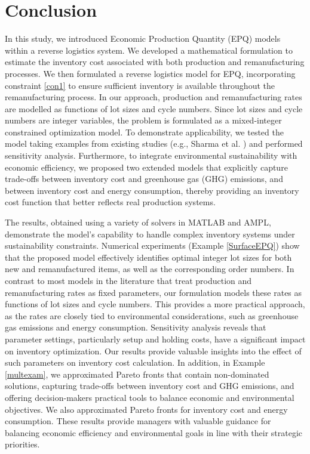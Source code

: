 \documentclass[11pt]{article}
\begin{document}
\section{Conclusion}\label{Con}

\noindent In this study, we introduced Economic Production Quantity (EPQ) models within a reverse logistics system. We developed a mathematical formulation to estimate the inventory cost associated with both production and remanufacturing processes. We then formulated a reverse logistics model for EPQ, incorporating constraint \eqref{con1} to ensure sufficient inventory is available throughout the remanufacturing process. In our approach, production and remanufacturing rates are modelled as functions of lot sizes and cycle numbers. Since lot sizes and cycle numbers are integer variables, the problem is formulated as a mixed-integer constrained optimization model. To demonstrate applicability, we tested the model taking examples from existing studies (e.g., Sharma et al. \cite{Swati2021}) and performed sensitivity analysis. Furthermore, to integrate environmental sustainability with economic efficiency, we proposed two extended models that explicitly capture trade-offs between inventory cost and greenhouse gas (GHG) emissions, and between inventory cost and energy consumption, thereby providing an inventory cost function that better reflects real production systems.

\noindent The results, obtained using a variety of solvers in MATLAB and AMPL, demonstrate the model's capability to handle complex inventory systems under sustainability constraints. Numerical experiments (Example \ref{SurfaceEPQ}) show that the proposed model  effectively identifies optimal integer lot sizes for both new and remanufactured items, as well as the corresponding order numbers. In contrast to most models in the literature that treat production and remanufacturing rates as fixed parameters, our formulation models these rates as functions of lot sizes and cycle numbers. This provides a more practical approach, as the rates are closely tied to environmental considerations, such as greenhouse gas emissions and energy consumption. Sensitivity analysis reveals that parameter settings, particularly setup and holding costs, have a significant impact on inventory optimization. Our results provide valuable insights into the effect of such parameters on inventory cost calculation. In addition, in Example \ref{multexam}, we approximated Pareto fronts that contain non-dominated solutions, capturing trade-offs between inventory cost and GHG emissions, and offering decision-makers practical tools to balance economic and environmental objectives. We also approximated Pareto fronts for inventory cost and energy consumption. These results provide managers with valuable guidance for balancing economic efficiency and environmental goals in line with their strategic priorities.
\end{document}
